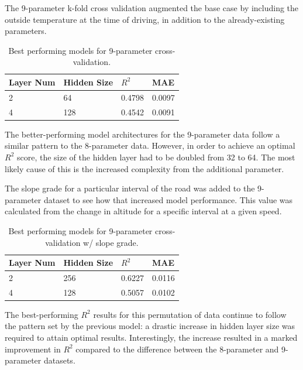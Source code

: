 \documentclass[letterpaper]{article}
\begin{document}
The 9-parameter k-fold cross validation augmented the base case by 
including the outside temperature at the time of driving, in addition to 
the already-existing parameters.

\begin{table}[]
    \centering
    \small
    \begin{tabular}{|l|l|l|l|}
        \hline
        \textbf{Layer Num} & \textbf{Hidden Size} & \textbf{$R^{2}$} & \textbf{MAE} \\
        \hline
        2              	& 64               	& 0.4798  	& 0.0097   	\\
        4              	& 128              	& 0.4542  	& 0.0091 	\\
        \hline
    \end{tabular}
    \caption{Best performing models for 9-parameter cross-validation.}
    \label{tab:tb2}
\end{table}

The better-performing model architectures for the 9-parameter data follow 
a similar pattern to the 8-parameter data. However, in order to achieve an 
optimal $R^{2}$ score, the size of the hidden layer had to be doubled from 
32 to 64. The most likely cause of this is the increased complexity from 
the additional parameter.

The slope grade for a particular interval of the road was added to the 
9-parameter dataset to see how that increased model performance. This 
value was calculated from the change in altitude for a specific interval 
at a given speed.

\begin{table}[]
    \centering
    \small
    \begin{tabular}{|l|l|l|l|}
        \hline
        \textbf{Layer Num} & \textbf{Hidden Size} & \textbf{$R^{2}$} & \textbf{MAE} \\
        \hline
        2              	& 256              	& 0.6227  	& 0.0116   	\\
        4              	& 128              	& 0.5057  	& 0.0102 	\\
        \hline 
    \end{tabular}
    \caption{Best performing models for 9-parameter cross-validation w/ slope grade.}
    \label{tab:tb3}
\end{table}

The best-performing $R^{2}$ results for this permutation of data continue 
to follow the pattern set by the previous model: a drastic increase in 
hidden layer size was required to attain optimal results. Interestingly, 
the increase resulted in a marked improvement in $R^{2}$ compared to the 
difference between the 8-parameter and 9-parameter datasets.
\end{document}
